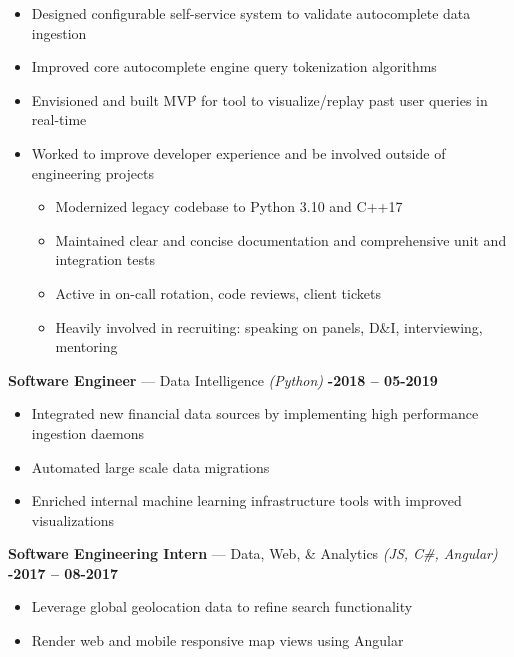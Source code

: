 \documentclass[margin,10pt]{res/res}
\begin{document}
\begin{resume}
\begin{itemize}
\begin{itemize}
        \end{itemize}
        \item Designed configurable self-service system to validate autocomplete data ingestion
        \item Improved core autocomplete engine query tokenization algorithms
        \item Envisioned and built MVP for tool to visualize/replay past user queries in real-time
        \item Worked to improve developer experience and be involved outside of engineering projects
        \begin{itemize}
            \item Modernized legacy codebase to Python 3.10 and C++17
            \item Maintained clear and concise documentation and comprehensive unit and integration tests
            \item Active in on-call rotation, code reviews, client tickets
            \item Heavily involved in recruiting: speaking on panels, D\&I, interviewing, mentoring
        \end{itemize}
    \end{itemize}
    \textbf{Software Engineer} --- Data Intelligence
    \textit{(Python)}\hfill
    \textsc{\bfseries{}-2018 -- 05-2019}
    \vspace{0.5em}
    \begin{itemize}
        \item Integrated new financial data sources by implementing high performance ingestion daemons
        \item Automated large scale data migrations
        \item Enriched internal machine learning infrastructure tools with improved visualizations
    \end{itemize}
    \textbf{Software Engineering Intern} --- Data, Web, \& Analytics
    \textit{(JS, C\#, Angular)}\hfill
    \textsc{\bfseries{}-2017 -- 08-2017}
    \vspace{0.5em}
    \begin{itemize}
        \item Leverage global geolocation data to refine search functionality
        \item Render web and mobile responsive map views using Angular
    \end{itemize}

    \vspace{4pt}
    

\end{resume}
\end{document}
